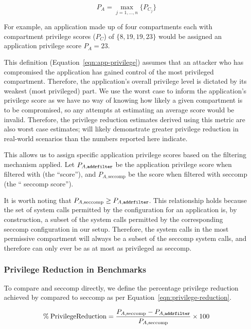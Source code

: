 \begin{equation} \label{eqn:app-privilege} 
    P_A = \max_{j=1,\dots,n} \{ P_{C_j} \} 
\end{equation} 

For example, an application made up of four compartments each
with compartment privilege scores ($P_C$) of $\{8, 19, 19, 23\}$ would be
assigned an application privilege score $P_A = 23$.

This definition (Equation~\ref{eqn:app-privilege}) assumes that an attacker who
has compromised the application has gained control of the most privileged
compartment. Therefore, the application's overall privilege level is
dictated by its weakest (most privileged) part. We use the worst case to
inform the application's privilege score as we have no way of knowing how
likely a given compartment is to be compromised, so any attempts at
estimating an average score would be invalid. Therefore, the privilege
reduction estimates derived using this metric are also worst case estimates;
\af will likely demonstrate greater privilege reduction in real-world
scenarios than the numbers reported here indicate. 

This allows us to assign specific application privilege scores based on the
filtering mechanism applied. Let $P_{A, \text{\texttt{addrfilter}}}$ be the application
privilege score when filtered with \af (the ``\af score''), and 
$P_{A, \text{seccomp}}$ be the score when filtered with seccomp (the ``
seccomp score''). 

It is worth noting that $P_{A, \text{seccomp}} \ge P_{A, \texttt{addrfilter}}$. This
relationship holds because the set of system calls permitted by the \af 
configuration for an application is, by construction, a subset of the system
calls permitted by the corresponding seccomp configuration in our setup.
Therefore, the system calls in the most permissive \af compartment will always
be a subset of the seccomp system calls, and therefore \af can only ever be as at
most as privileged as seccomp.

\subsubsection{Privilege Reduction in Benchmarks}

To compare \af and seccomp directly, we define the percentage privilege
reduction achieved by \af compared to seccomp as per 
Equation~\ref{eqn:privilege-reduction}.  

\begin{equation}\label{eqn:privilege-reduction}
    \% \: \mathrm{Privilege Reduction} = 
    \frac{P_{A, \text{seccomp}} - P_{A, \text{\texttt{addrfilter}}}}{P_{A, \text{seccomp}}} 
            \times 100
\end{equation}

